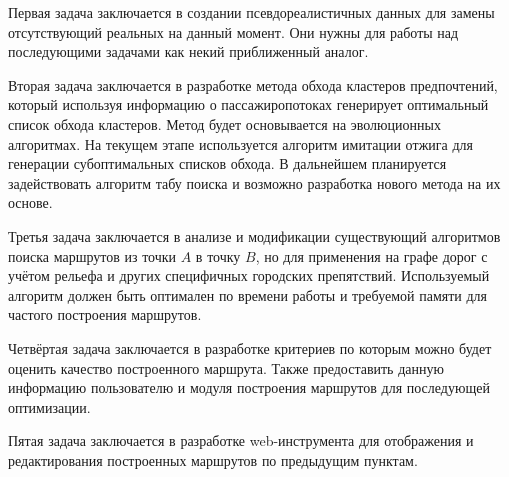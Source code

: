 Первая задача заключается в создании псевдореалистичных данных для замены отсутствующий реальных 
на данный момент. Они нужны для работы над последующими задачами как некий приближенный аналог.

Вторая задача заключается в разработке метода обхода кластеров предпочтений, который используя 
информацию о пассажиропотоках генерирует оптимальный список обхода кластеров. Метод будет 
основывается на эволюционных алгоритмах. На текущем этапе используется алгоритм имитации отжига 
для генерации субоптимальных списков обхода. В дальнейшем планируется задействовать алгоритм 
табу поиска и возможно разработка нового метода на их основе.

Третья задача заключается в анализе и модификации существующий алгоритмов поиска маршрутов из 
точки \( A \) в точку \( B \), но для применения на графе дорог с учётом рельефа и других 
специфичных городских препятствий. Используемый алгоритм должен быть оптимален по времени работы 
и требуемой памяти для частого построения маршрутов.

Четвёртая задача заключается в разработке критериев по которым можно будет оценить качество 
построенного маршрута. Также предоставить данную информацию пользователю и модуля построения 
маршрутов для последующей оптимизации.

Пятая задача заключается в разработке web-инструмента для отображения и редактирования построенных 
маршрутов по предыдущим пунктам.